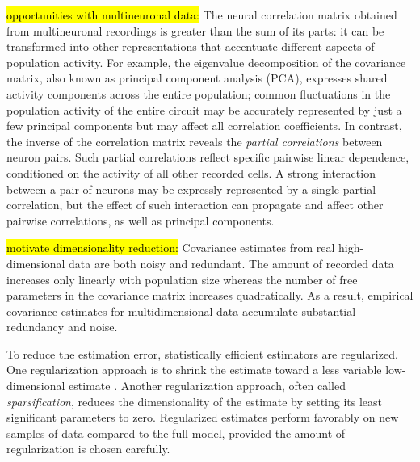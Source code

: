 \hl{\tiny opportunities with multineuronal data:}
The neural correlation matrix obtained from multineuronal recordings is greater than the sum of its parts: it can be transformed into other representations  that accentuate different aspects of population activity.  
For example, the eigenvalue decomposition of the covariance matrix, also known as principal component analysis (PCA), expresses shared activity components across the entire population;  common fluctuations in the population activity of the entire circuit may be accurately represented by just a few principal components but may affect all correlation coefficients. 
In contrast, the inverse of the correlation matrix reveals the \emph{partial correlations} between neuron pairs.  Such partial correlations reflect specific pairwise linear dependence, conditioned on the activity of all other recorded cells. 
A strong interaction between a pair of neurons may be expressly represented by a single partial correlation, 
but the effect of such interaction can propagate and affect other pairwise correlations, as well as principal components.


\hl{\tiny motivate dimensionality reduction:}
 Covariance estimates from real high-dimensional data  are both noisy and redundant.  The amount of recorded data increases only linearly with population size whereas the number of free parameters in the covariance matrix increases quadratically.  As a result, empirical covariance estimates for multidimensional data  accumulate substantial redundancy and noise.  

To reduce the estimation error, statistically efficient estimators are regularized.  One regularization approach is to shrink the   estimate toward a less variable low-dimensional estimate \citep{Schafer:2005}.  Another regularization approach, often called \emph{sparsification}, reduces the dimensionality of the estimate by setting its least significant parameters to zero. 
Regularized estimates perform favorably on new samples of data compared to the full model, provided the amount of regularization is chosen carefully. 

